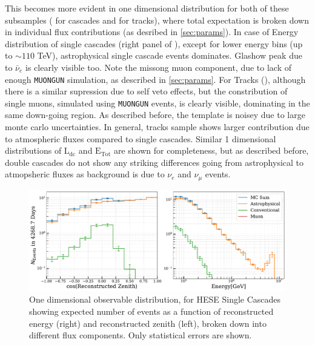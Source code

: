 This becomes more evident in one dimensional distribution for both of these subsamples ( for cascades and  for tracks), where total expectation is broken down in individual flux contributions (as desribed in \ref{sec:params}). In case of Energy distribution of single cascades (right panel of ), except for lower energy bins (up to $\sim110$ TeV), astrophysical single cascade events dominates. Glashow peak due to $\bar{\nu}_e$ is clearly visible too. Note the missong muon component, due to lack of enough \texttt{MUONGUN} simulation, as described in \ref{sec:params}. For Tracks (), although there is a similar supression due to self veto effects, but the constribution of single muons, simulated using \texttt{MUONGUN} events, is clearly visible, dominating in the same down-going region. As described before, the template is noisey due to large monte carlo uncertainties. In general, tracks sample shows larger contribution due to atmospheric fluxes compared to single cascades. Similar 1 dimensional distributions of $\mathrm{L}_{\mathrm{dc}}$ and $\mathrm{E}_{\mathrm{Tot}}$ are shown for completeness, but as described before, double cascades do not show any striking differences going from astrophysical to atmopsheric fluxes as background is due to $\nu_{e}$ and $\nu_{\mu}$ events.


\begin{figure}[h!]
    \caption{One dimensional observable distribution, for HESE Single Cascades showing expected number of events as a function of reconstructed energy (right) and reconstructed zenith (left), broken down into different flux components. Only statistical errors are shown.}
    \includegraphics{./figures/Analysis/Cascades.pdf}
\end{figure}

